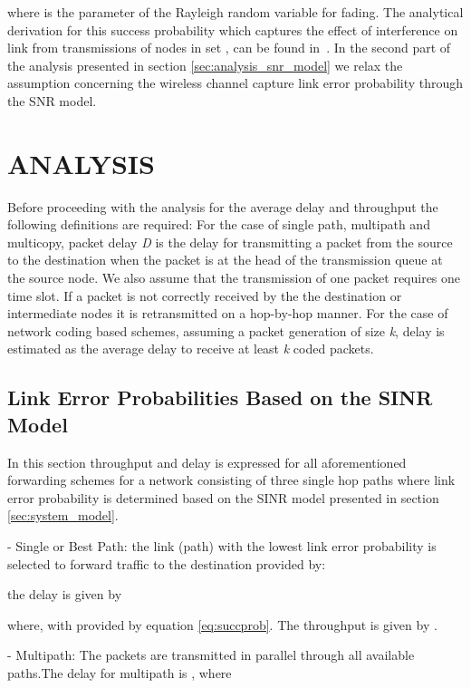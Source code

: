 \documentclass[journal, onecolumn, 12pt]{IEEEtran}
\begin{document}
where  is the parameter of the Rayleigh random variable for fading. The analytical derivation for this success probability
which captures the effect of interference on link  from transmissions of nodes in set , can be found in~\cite{b:Nguyen}.
In the second part of the analysis presented in section \ref{sec:analysis_snr_model} we relax the assumption concerning the wireless channel capture link error probability through the SNR model.

\section{\uppercase{Analysis}}
\label{sec:analysis}

Before proceeding with the analysis for the average delay and throughput the following definitions are required:
For the case of single path, multipath and multicopy, packet delay \textit{D} is the delay for transmitting a packet from the source to the destination when the packet is at the head of the transmission queue at the source node.
We also assume that the transmission of one packet requires one time slot.
If a packet is not correctly received by the the destination or intermediate nodes it is retransmitted on a hop-by-hop manner.
For the case of network coding based schemes, assuming a packet generation of size \textit{k}, delay is estimated as the average delay to receive at least \textit{k} coded packets.

\subsection{Link Error Probabilities Based on the SINR Model}
\label{sec:analysis_sinr_model}

In this section throughput and delay is expressed for all aforementioned forwarding schemes for a network consisting of three single hop paths where link error probability is determined
based on the SINR model presented in section \ref{sec:system_model}.

- Single or Best Path: the link  (path) with the lowest link error probability is selected to forward traffic to the destination provided by:

the delay is given by

where,  with  provided by equation \ref{eq:succprob}. The throughput is given by .

- Multipath: The packets are transmitted in parallel through all available paths.The delay for multipath is , where
\end{document}
